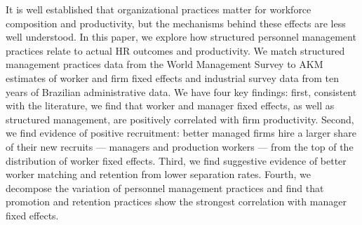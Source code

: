 \noindent It is well established that organizational practices matter for workforce composition and productivity, but the mechanisms behind these effects are less well understood. In this paper, we explore how structured personnel management practices relate to actual HR outcomes and productivity. We match structured management practices data from the World Management Survey to AKM estimates of worker and firm fixed effects and industrial survey data from ten years of Brazilian  administrative data. We have four key findings: first, consistent with the literature, we find that worker and manager fixed effects, as well as structured management, are positively correlated with firm productivity. Second, we find evidence of positive recruitment: better managed firms hire a larger share of their new recruits --- managers and production workers --- from the top of the distribution of worker fixed effects. Third, we find suggestive evidence of better worker matching and retention from lower separation rates. Fourth, we decompose the variation of personnel management practices and find that promotion and retention practices show the strongest correlation with manager fixed effects. 